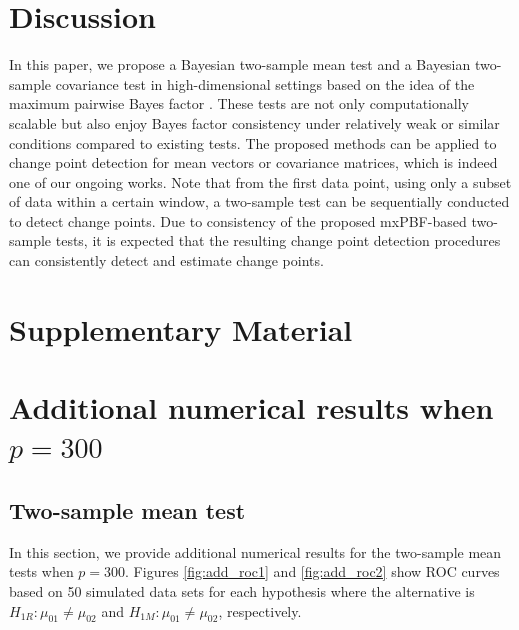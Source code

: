 \documentclass[11pt]{article}
\begin{document}

\section{Discussion}\label{sec:disc}

In this paper, we propose a Bayesian two-sample mean test and a Bayesian two-sample covariance test in high-dimensional settings based on the idea of the maximum pairwise Bayes factor \citep{lee2018maximum}.
These tests are not only computationally scalable but also enjoy Bayes factor consistency under relatively weak or similar conditions compared to existing tests.
The proposed methods can be applied to change point detection for mean vectors or covariance matrices, which is indeed one of our ongoing works.
Note that from the first data point, using only a subset of data within a certain window, a two-sample test can be sequentially conducted to detect change points.
Due to consistency of the proposed mxPBF-based two-sample tests, it is expected that the resulting change point detection procedures can consistently detect and estimate change points.












\newpage

\appendix

\section*{Supplementary Material}



\section{Additional numerical results when $p=300$}\label{sec:additional_sim}



\subsection{Two-sample mean test}

In this section, we provide additional numerical results for the two-sample mean tests when $p=300$.
Figures \ref{fig:add_roc1} and \ref{fig:add_roc2} show ROC curves based on 50 simulated data sets for each hypothesis where the alternative is $H_{1R}: \mu_{01} \neq \mu_{02}$ and $H_{1M}: \mu_{01} \neq \mu_{02}$, respectively.
\end{document}
